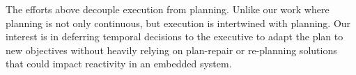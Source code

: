 The efforts above decouple execution from planning. Unlike our work
where planning is not only continuous, but execution is intertwined
with planning. Our interest is in deferring temporal decisions to the
executive to adapt the plan to new objectives without heavily relying
on plan-repair or re-planning solutions that could impact reactivity
in an embedded system. 




